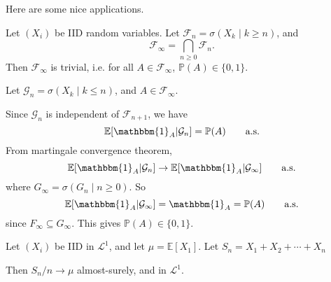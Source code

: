 \documentclass[12pt]{article}
\begin{document}
Here are some nice applications.

\begin{theorem}
	Let $(X_i)$ be IID random variables. Let $\mathcal{F}_n = \sigma(X_k \mid k \geq n)$, and
	\[
	\mathcal{F}_\infty = \bigcap_{n \geq 0} \mathcal{F}_n.
	\]
	Then $\mathcal{F}_\infty$ is trivial, i.e. for all $A \in \mathcal{F}_\infty$, $\mathbb{P}(A) \in \{0, 1\}$.
\end{theorem}

\begin{proofbox}
	Let $\mathcal{G}_n = \sigma(X_k \mid k \leq n)$, and $A \in \mathcal{F}_\infty$.

	Since $\mathcal{G}_n$ is independent of $\mathcal{F}_{n+1}$, we have
	\[
		\mathbb{E}[\mathbbm{1}_{A} | \mathcal{G}_n] = \mathbb{P}(A) \qquad \text{a.s.}
	\]
	From martingale convergence theorem,
	\[
		\mathbb{E}[\mathbbm{1}_{A} | \mathcal{G}_n] \to \mathbb{E}[\mathbbm{1}_{A} | \mathcal{G}_\infty] \qquad \text{a.s.}
	\]
	where $G_\infty = \sigma(G_n \mid n \geq 0)$. So
	\[
		\mathbb{E}[\mathbbm{1}_{A} | \mathcal{G}_\infty] = \mathbbm{1}_{A} = \mathbb{P}(A)\qquad\text{a.s.}
	\]
	since $F_\infty \subseteq G_{\infty}$. This gives $\mathbb{P}(A) \in \{0, 1\}$.
\end{proofbox}


\begin{theorem}
	Let $(X_i)$ be IID in $\mathcal{L}^1$, and let $\mu = \mathbb{E}[X_1]$. Let $S_n = X_1 + X_2 + \cdots + X_n$ 

	Then $S_n/n \to \mu$ almost-surely, and in $\mathcal{L}^1$.
\end{theorem}
\end{document}

